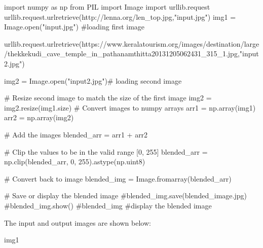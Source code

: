 \documentclass[
  letterpaper,
  DIV=11,
  numbers=noendperiod]{scrreprt}
\newenvironment{Shaded}{\begin{snugshade}}{\end{snugshade}}
\newcommand{\BuiltInTok}[1]{\textcolor[rgb]{0.00,0.23,0.31}{#1}}
\newcommand{\CommentTok}[1]{\textcolor[rgb]{0.37,0.37,0.37}{#1}}
\newcommand{\DecValTok}[1]{\textcolor[rgb]{0.68,0.00,0.00}{#1}}
\newcommand{\ImportTok}[1]{\textcolor[rgb]{0.00,0.46,0.62}{#1}}
\newcommand{\NormalTok}[1]{\textcolor[rgb]{0.00,0.23,0.31}{#1}}
\newcommand{\OperatorTok}[1]{\textcolor[rgb]{0.37,0.37,0.37}{#1}}
\newcommand{\StringTok}[1]{\textcolor[rgb]{0.13,0.47,0.30}{#1}}
\theoremstyle{plain}
\theoremstyle{definition}
\theoremstyle{remark}
\begin{document}
\begin{Shaded}
\begin{Highlighting}[]
\ImportTok{import}\NormalTok{ numpy }\ImportTok{as}\NormalTok{ np}
\ImportTok{from}\NormalTok{ PIL }\ImportTok{import}\NormalTok{ Image}
\ImportTok{import}\NormalTok{ urllib.request}
\NormalTok{urllib.request.urlretrieve(}\StringTok{\textquotesingle{}http://lenna.org/len\_top.jpg\textquotesingle{}}\NormalTok{,}\StringTok{"input.jpg"}\NormalTok{)}
\NormalTok{img1 }\OperatorTok{=}\NormalTok{ Image.}\BuiltInTok{open}\NormalTok{(}\StringTok{"input.jpg"}\NormalTok{) }\CommentTok{\#loading first image}

\NormalTok{urllib.request.urlretrieve(}\StringTok{\textquotesingle{}https://www.keralatourism.org/images/destination/large/thekkekudi\_cave\_temple\_in\_pathanamthitta20131205062431\_315\_1.jpg\textquotesingle{}}\NormalTok{,}\StringTok{"input2.jpg"}\NormalTok{)}

\NormalTok{img2 }\OperatorTok{=}\NormalTok{ Image.}\BuiltInTok{open}\NormalTok{(}\StringTok{"input2.jpg"}\NormalTok{)}\CommentTok{\# loading second image}

\CommentTok{\# Resize second image to match the size of the first image}
\NormalTok{img2 }\OperatorTok{=}\NormalTok{ img2.resize(img1.size)}
\CommentTok{\# Convert images to numpy arrays}
\NormalTok{arr1 }\OperatorTok{=}\NormalTok{ np.array(img1)}
\NormalTok{arr2 }\OperatorTok{=}\NormalTok{ np.array(img2)}

\CommentTok{\# Add the images}
\NormalTok{blended\_arr }\OperatorTok{=}\NormalTok{ arr1 }\OperatorTok{+}\NormalTok{ arr2}

\CommentTok{\# Clip the values to be in the valid range [0, 255]}
\NormalTok{blended\_arr }\OperatorTok{=}\NormalTok{ np.clip(blended\_arr, }\DecValTok{0}\NormalTok{, }\DecValTok{255}\NormalTok{).astype(np.uint8)}

\CommentTok{\# Convert back to image}
\NormalTok{blended\_img }\OperatorTok{=}\NormalTok{ Image.fromarray(blended\_arr)}

\CommentTok{\# Save or display the blended image}
\CommentTok{\#blended\_img.save(\textquotesingle{}blended\_image.jpg\textquotesingle{})}
\CommentTok{\#blended\_img.show()}
\CommentTok{\#blended\_img \#display the blended image}
\end{Highlighting}
\end{Shaded}

The input and output images are shown below:

\begin{Shaded}
\begin{Highlighting}[]
\NormalTok{img1}
\end{Highlighting}
\end{Shaded}
\end{document}
